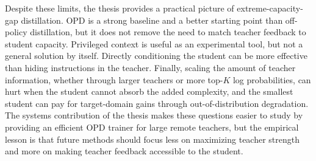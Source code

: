 Despite these limits, the thesis provides a practical picture of extreme-capacity-gap distillation. OPD is a strong baseline and a better starting point than off-policy distillation, but it does not remove the need to match teacher feedback to student capacity. Privileged context is useful as an experimental tool, but not a general solution by itself. Directly conditioning the student can be more effective than hiding instructions in the teacher. Finally, scaling the amount of teacher information, whether through larger teachers or more top-$K$ log probabilities, can hurt when the student cannot absorb the added complexity, and the smallest student can pay for target-domain gains through out-of-distribution degradation. The systems contribution of the thesis makes these questions easier to study by providing an efficient OPD trainer for large remote teachers, but the empirical lesson is that future methods should focus less on maximizing teacher strength and more on making teacher feedback accessible to the student.
